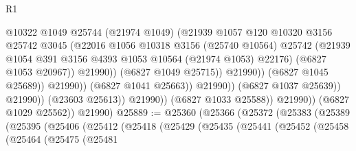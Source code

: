 \begin{lexlean}{R1}
\begin{coremodule}
                                              @10322
                                              @1049
                                              @25744
                                              (@21974 @1049)
                                              (@21939
                                                @1057
                                                @120
                                                @10320
                                                @3156
                                                @25742
                                                @3045
                                                (@22016
                                                  @1056
                                                  @10318
                                                  @3156
                                                  (@25740 @10564)
                                                  @25742
                                                  (@21939
                                                    @1054
                                                    @391
                                                    @3156
                                                    @4393
                                                    @1053
                                                    @10564
                                                    (@21974 @1053)
                                                    @22176)
                                                  (@6827 @1053 @20967))
                                                @21990))
                                            (@6827 @1049 @25715))
                                          @21990))
                                      (@6827 @1045 @25689))
                                    @21990))
                                (@6827 @1041 @25663))
                              @21990))
                          (@6827 @1037 @25639))
                        @21990))
                    (@23603 @25613))
                  @21990))
              (@6827 @1033 @25588))
            @21990))
        (@6827 @1029 @25562))
      @21990)
@25889 := @25360
    (@25366
      (@25372
        (@25383
          (@25389
            (@25395
              (@25406
                (@25412
                  (@25418
                    (@25429
                      (@25435
                        (@25441
                          (@25452
                            (@25458
                              (@25464
                                (@25475
                                  (@25481

\end{coremodule}
\end{lexlean}
